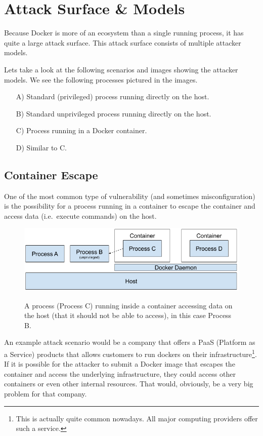 \section{Attack Surface \& Models}
Because Docker is more of an ecosystem than a single running process, it has quite a large attack surface. This attack surface consists of multiple attacker models.

\hfill

Lets take a look at the following scenarios and images showing the attacker models.
We see the following processes pictured in the images.
\begin{enumerate}
    \item[A)] Standard (privileged) process running directly on the host.
    \item[B)] Standard unprivileged process running directly on the host.
    \item[C)] Process running in a Docker container.
    \item[D)] Similar to C.
\end{enumerate}

\subsection{Container Escape}
One of the most common type of vulnerability (and sometimes misconfiguration) is the possibility for a process running in a container to escape the container and access data (i.e.\ execute commands) on the host.
\begin{figure}[ht]
    \centering
    \includegraphics[width=.9\linewidth]{resources/images/attack-scenario-3.png}
    \caption{}\label{fig:container-escape}
    \medskip
    \small
    A process (Process C) running inside a container accessing data on the host (that it should not be able to access), in this case Process B.
\end{figure}

\hfill

An example attack scenario would be a company that offers a PaaS (Platform as a Service) products that allows customers to run dockers on their infrastructure\footnote{This is actually quite common nowadays. All major computing providers offer such a service.}. If it is possible for the attacker to submit a Docker image that escapes the container and access the underlying infrastructure, they could access other containers or even other internal resources. That would, obviously, be a very big problem for that company.

